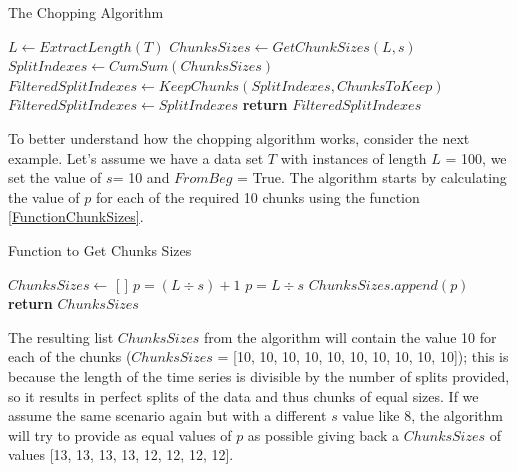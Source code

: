 \begin{algorithm}
    \caption{The Chopping Algorithm}\label{AlgorithmChopping}
    \begin{algorithmic}[1]
        \State $L \gets ExtractLength(T)$
        \State $ChunksSizes \gets GetChunkSizes(L,s)$
        \State $SplitIndexes \gets CumSum(ChunksSizes)$
                \State $FilteredSplitIndexes \gets KeepChunks(SplitIndexes,ChunksToKeep)$
            \Else
                \State $FilteredSplitIndexes \gets SplitIndexes$
            \EndIf
        \State \textbf{return} $FilteredSplitIndexes$
      \EndFunction
    \end{algorithmic}
\end{algorithm}

To better understand how the chopping algorithm works, consider the next example.
Let's assume we have a data set $T$ with instances of length $L$ = 100, we set the value of $s$= 10 and $FromBeg$ = True.
The algorithm starts by calculating the value of $p$ for each of the required 10 chunks using the function \ref{FunctionChunkSizes}.

\begin{algorithm}
    \caption{Function to Get Chunks Sizes}\label{FunctionChunkSizes}
    \begin{algorithmic}[1]
      \State $ChunksSizes \gets$ [ ]
                \State $p = (L \div{s}) + 1$
            \Else
                \State $p = L \div{s}$
            \EndIf
            \State $ChunksSizes.append(p)$
        \EndFor
        \State \textbf{return} $ChunksSizes$
      \EndFunction
    \end{algorithmic}
\end{algorithm}

The resulting list $ChunksSizes$ from the algorithm will contain the value 10 for each of the chunks ($ChunksSizes$ = [10, 10, 10, 10, 10, 10, 10, 10, 10, 10]);
this is because the length of the time series is divisible by the number of splits provided, so it results in perfect splits of the data and thus chunks of equal sizes.
If we assume the same scenario again but with a different $s$ value like 8, the algorithm will try to provide as equal values of $p$ as possible
giving back a $ChunksSizes$ of values [13, 13, 13, 13, 12, 12, 12, 12].

